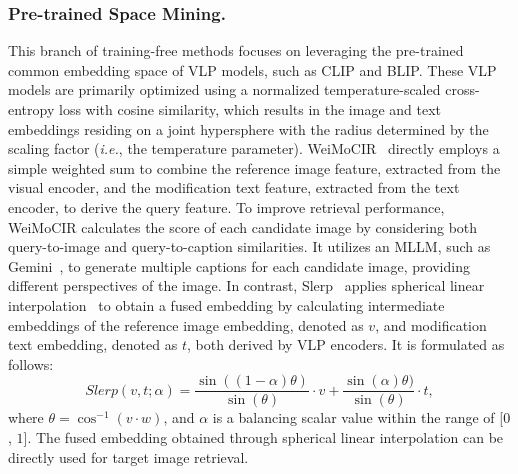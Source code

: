 \subsubsection{Pre-trained Space Mining.} 
This branch of training-free methods focuses on leveraging the pre-trained common embedding space of VLP models, such as CLIP and BLIP. These VLP models are primarily optimized using a normalized temperature-scaled cross-entropy loss with cosine similarity, which results in the image and text embeddings residing on a joint hypersphere with the radius determined by the scaling factor (\textit{i.e.}, the temperature parameter). 
WeiMoCIR~\cite{weimocir} directly employs a simple weighted sum to combine the reference image feature, extracted from the visual encoder, and the modification text feature, extracted from the text encoder, to derive the query feature. To improve retrieval performance, WeiMoCIR calculates the score of each candidate image by considering both query-to-image and query-to-caption similarities. It utilizes an MLLM, such as Gemini~\cite{team2023gemini}, to generate multiple captions for each candidate image, providing different perspectives of the image.
In contrast, Slerp~\cite{slerp} applies spherical linear interpolation~\cite{shoemake1985animating} to obtain a fused embedding by calculating intermediate embeddings of the reference image embedding, denoted as $v$, and modification text embedding, denoted as $t$, both derived by VLP encoders. It is formulated as follows: 
\begin{equation}
Slerp(v,t;\alpha) = \frac{\sin((1 - \alpha)\theta)}{\sin(\theta)} \cdot v + \frac{\sin( \alpha)\theta)}{\sin(\theta)} \cdot t,
\end{equation}
where $\theta = \cos^{-1}(v \cdot w)$, and $\alpha$ is a balancing scalar value within the range of [$0$, $1$]. The fused embedding obtained through spherical linear interpolation can be directly used for target image retrieval. 